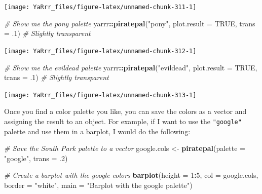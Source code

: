 \documentclass[]{book}
\newenvironment{Shaded}{\begin{snugshade}}{\end{snugshade}}
\newcommand{\KeywordTok}[1]{\textcolor[rgb]{0.13,0.29,0.53}{\textbf{#1}}}
\newcommand{\DataTypeTok}[1]{\textcolor[rgb]{0.13,0.29,0.53}{#1}}
\newcommand{\DecValTok}[1]{\textcolor[rgb]{0.00,0.00,0.81}{#1}}
\newcommand{\StringTok}[1]{\textcolor[rgb]{0.31,0.60,0.02}{#1}}
\newcommand{\CommentTok}[1]{\textcolor[rgb]{0.56,0.35,0.01}{\textit{#1}}}
\newcommand{\OtherTok}[1]{\textcolor[rgb]{0.56,0.35,0.01}{#1}}
\newcommand{\OperatorTok}[1]{\textcolor[rgb]{0.81,0.36,0.00}{\textbf{#1}}}
\newcommand{\NormalTok}[1]{#1}
\theoremstyle{definition}
\theoremstyle{definition}
\theoremstyle{remark}
\begin{document}
\begin{center}\texttt{[image: YaRrr\_files/figure-latex/unnamed-chunk-311-1]} \end{center}

\begin{Shaded}
\begin{Highlighting}[]
\CommentTok{# Show me the pony palette}
\NormalTok{yarrr}\OperatorTok{::}\KeywordTok{piratepal}\NormalTok{(}\StringTok{"pony"}\NormalTok{,            }
                 \DataTypeTok{plot.result =} \OtherTok{TRUE}\NormalTok{,}
                 \DataTypeTok{trans =}\NormalTok{ .}\DecValTok{1}\NormalTok{)          }\CommentTok{# Slightly transparent}
\end{Highlighting}
\end{Shaded}

\begin{center}\texttt{[image: YaRrr\_files/figure-latex/unnamed-chunk-312-1]} \end{center}

\begin{Shaded}
\begin{Highlighting}[]
\CommentTok{# Show me the evildead palette}
\NormalTok{yarrr}\OperatorTok{::}\KeywordTok{piratepal}\NormalTok{(}\StringTok{"evildead"}\NormalTok{,            }
                 \DataTypeTok{plot.result =} \OtherTok{TRUE}\NormalTok{,}
                 \DataTypeTok{trans =}\NormalTok{ .}\DecValTok{1}\NormalTok{)          }\CommentTok{# Slightly transparent}
\end{Highlighting}
\end{Shaded}

\begin{center}\texttt{[image: YaRrr\_files/figure-latex/unnamed-chunk-313-1]} \end{center}

Once you find a color palette you like, you can save the colors as a
vector and assigning the result to an object. For example, if I want to
use the \texttt{"google"} palette and use them in a barplot, I would do
the following:

\begin{Shaded}
\begin{Highlighting}[]
\CommentTok{# Save the South Park palette to a vector}
\NormalTok{google.cols <-}\StringTok{ }\KeywordTok{piratepal}\NormalTok{(}\DataTypeTok{palette =} \StringTok{"google"}\NormalTok{, }
                         \DataTypeTok{trans =}\NormalTok{ .}\DecValTok{2}\NormalTok{)}

\CommentTok{# Create a barplot with the google colors}
\KeywordTok{barplot}\NormalTok{(}\DataTypeTok{height =} \DecValTok{1}\OperatorTok{:}\DecValTok{5}\NormalTok{,}
       \DataTypeTok{col =}\NormalTok{ google.cols,}
       \DataTypeTok{border =} \StringTok{"white"}\NormalTok{,}
       \DataTypeTok{main =} \StringTok{"Barplot with the google palette"}\NormalTok{)}
\end{Highlighting}
\end{Shaded}
\end{document}
